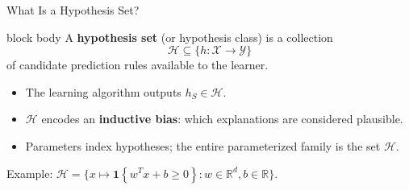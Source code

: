 \documentclass[aspectratio=169,10pt]{beamer}
\newcommand{\X}{\mathcal{X}}
\newcommand{\Y}{\mathcal{Y}}
\newcommand{\Hc}{\mathcal{H}}
\newcommand{\ind}[1]{\mathbf{1}\!\left\{#1\right\}}
\begin{document}
\begin{frame}[t]{What Is a Hypothesis Set?}
  \vspace{0.24cm}
  \begin{beamercolorbox}[rounded=true,sep=0.28cm,wd=\linewidth]{block body}
    {\fontsize{16}{20}\selectfont
    A \textbf{hypothesis set} (or hypothesis class) is a collection
    \[
      \Hc\subseteq\{h:\X\to\Y\}
    \]
    of candidate prediction rules available to the learner.}
  \end{beamercolorbox}

  \vspace{0.34cm}
  {\normalsize
  \begin{itemize}
    \setlength{\itemsep}{0.27cm}
    \item The learning algorithm outputs $h_S\in\Hc$.
    \item $\Hc$ encodes an \textbf{inductive bias}: which explanations are considered plausible.
    \item Parameters index hypotheses; the entire parameterized family is the set $\Hc$.
  \end{itemize}}

  \vspace{0.14cm}
  \centering
  {\normalsize Example: $\Hc=\{x\mapsto \ind{w^Tx+b\ge 0}:w\in\mathbb{R}^d,b\in\mathbb{R}\}$.}
\end{frame}
\end{document}
